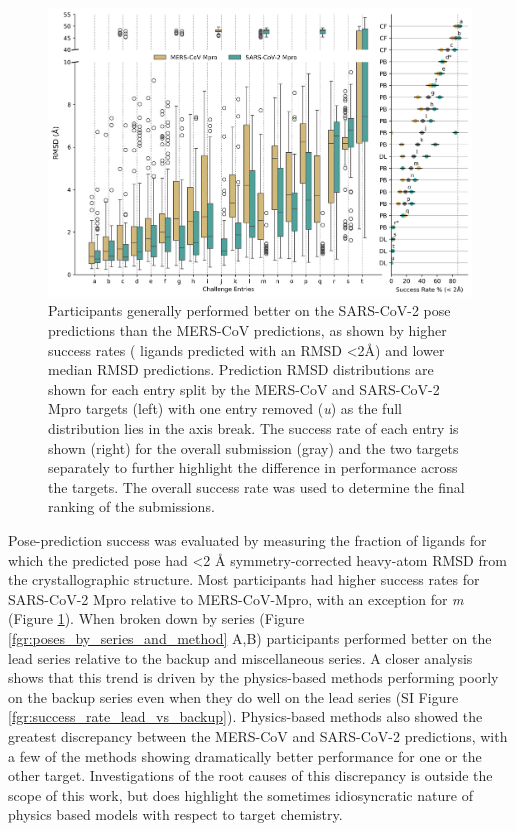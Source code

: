 \documentclass[journal=jcim,manuscript=article]{achemso}
\begin{document}
\begin{figure}
    \includegraphics[width=6in
    ]{04_figs_leaderboards/pose_comp.png}
  \caption{Participants generally performed better on the SARS-CoV-2 pose predictions than the MERS-CoV predictions, as shown by higher success rates ( ligands predicted with an RMSD \textless2Å) and lower median RMSD predictions. Prediction RMSD distributions are shown for each entry split by the MERS-CoV and SARS-CoV-2 Mpro targets (left) with one entry removed (\textit{u}) as the full distribution lies in the axis break. The success rate of each entry is shown (right) for the overall submission (gray) and the two targets separately to further highlight the difference in performance across the targets. The overall success rate was used to determine the final ranking of the submissions.}
  \label{fgr:poses_leaderboard}
\end{figure}

Pose-prediction success was evaluated by measuring the fraction of ligands for which the predicted pose had \textless 2 Å symmetry-corrected heavy-atom RMSD from the crystallographic structure. Most participants had higher success rates for SARS-CoV-2 Mpro relative to MERS-CoV-Mpro, with an exception for \textit{m} (Figure \ref{fgr:poses_leaderboard}). When broken down by series (Figure \ref{fgr:poses_by_series_and_method} A,B) participants performed better on the lead series relative to the backup and miscellaneous series. A closer analysis shows that this trend is driven by the physics-based methods performing poorly on the backup series even when they do well on the lead series (SI Figure \ref{fgr:success_rate_lead_vs_backup}). Physics-based methods also showed the greatest discrepancy between the MERS-CoV and SARS-CoV-2 predictions, with a few of the methods showing dramatically better performance for one or the other target. Investigations of the root causes of this discrepancy is outside the scope of this work, but does highlight the sometimes idiosyncratic nature of physics based models with respect to target chemistry. 
\end{document}
